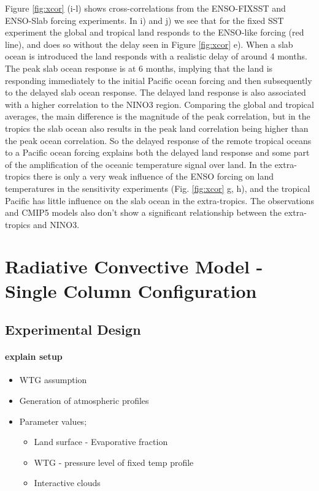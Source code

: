 Figure \ref{fig:xcor} (i-l) shows cross-correlations from the ENSO-FIXSST and 
ENSO-Slab forcing experiments. In i) and j) we see that for the fixed SST 
experiment the global and tropical land responds to the ENSO-like forcing (red 
line), and does so without the delay seen in Figure \ref{fig:xcor} e). When a 
slab ocean is introduced the land responds with a realistic delay of around 4 
months.  The peak slab ocean response is at 6 months, implying that the land is 
responding immediately to the initial Pacific ocean forcing and then 
subsequently to the delayed slab ocean response. The delayed land response is 
also associated with a higher correlation to the NINO3 region. Comparing the 
global and tropical averages, the main difference is the magnitude of the peak 
correlation, but in the tropics the slab ocean also results in the peak land 
correlation being higher than the peak ocean correlation. So the delayed 
response of the remote tropical oceans to a Pacific ocean forcing explains both 
the delayed land response and some part of the amplification of the oceanic 
temperature signal over land. In the extra-tropics there is only a very weak 
influence of the ENSO forcing on land temperatures in the sensitivity 
experiments (Fig.  \ref{fig:xcor} g, h), and the tropical Pacific has little 
influence on the slab ocean in the extra-tropics. The observations and CMIP5 
models also don't show a significant relationship between the extra-tropics and 
NINO3.


\section{Radiative Convective Model - Single Column Configuration}

\subsection{Experimental Design}
\paragraph{explain setup}
\begin{itemize}
	\item WTG assumption
	\item Generation of atmospheric profiles
	\item Parameter values;
		\begin{itemize}
			\item Land surface - Evaporative fraction
			\item WTG - pressure level of fixed temp profile
			\item Interactive clouds
		\end{itemize}
\end{itemize}
